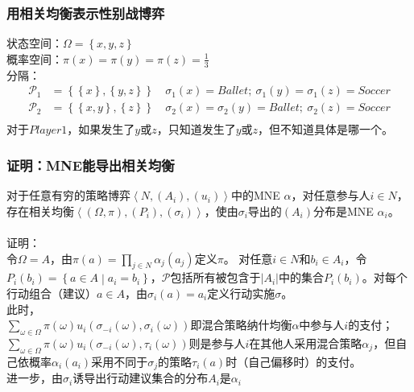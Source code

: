 \documentclass{beamer}
\begin{document}
\begin{frame}[label = interpret_correlated_equilibrium_using_BoS]
	\frametitle{用相关均衡表示性别战博弈}
	状态空间：$\Omega=\left\lbrace x,y,z\right\rbrace $\\
	概率空间：$\pi\left(x\right)=\pi\left(y\right)=\pi\left(z\right)=\frac{1}{3}$\\
	分隔：
	\begin{equation*}
		\begin{aligned}
			\mathcal{P}_{1} &= \left\lbrace \left\lbrace x\right\rbrace ,\left\lbrace y,z\right\rbrace \right\rbrace &\ \sigma_{1}\left( x\right)=Ballet;\ \sigma_{1}\left( y\right) =\sigma_{1}\left( z\right) =Soccer\\
			\mathcal{P}_{2} &= \left\lbrace \left\lbrace x,y\right\rbrace ,\left\lbrace z\right\rbrace \right\rbrace &\ \sigma_{2}\left( x\right) =\sigma_{2}\left( y\right) =Ballet;\ \sigma_{2}\left( z\right) =Soccer \\
		\end{aligned}
	\end{equation*}
	对于$Player 1$，如果发生了$y$或$z$，只知道发生了$y$或$z$，但不知道具体是哪一个。
	
\end{frame}

\begin{frame}[label = MNE_and_correlated_equilibrium]
	\frametitle{证明：MNE能导出相关均衡}
	对于任意有穷的策略博弈$\left\langle N,\left( A_{i}\right) ,\left( u_{i}\right) \right\rangle $中的MNE $\alpha$，对任意参与人$i\in N$，存在相关均衡$\left\langle \left( \Omega,\pi\right) ,\left( P_{i}\right) ,\left( \sigma_{i}\right) \right\rangle $，使由$\sigma_{i}$导出的$\left( A_{i}\right)$分布是MNE $\alpha_{i}$。\\~\\
	\alert{{\large 证明：}}\\
	令$\Omega = A$，由$ \pi\left(a\right)=\prod\limits_{j\in N} \alpha_{j} \left(a_{j}\right) $定义$\pi$。
	对任意$i\in N$和$b_{i}\in A_{i}$，令$P_{i}\left(b_{i}\right)=\left\lbrace a\in A \middle| a_{i}=b_{i} \right\rbrace$，$\mathcal{P}$包括所有被包含于$\left|A_{i}\right|$中的集合$P _{i}\left(b_{i}\right)$。对每个行动组合（建议）$a\in A$，由$\sigma_{i}\left(a\right)=a_{i}$定义行动实施$\sigma$。\\
	此时，\\
	$\sum\limits_{\omega\in\Omega} \pi\left(\omega\right)u_{i}\left(\sigma_{-i}\left(\omega\right),\sigma_{i}\left(\omega\right)\right)$即混合策略纳什均衡$\alpha$中参与人$i$的支付；\\
	$\sum\limits_{\omega\in\Omega} \pi\left(\omega\right)u_{i}\left(\sigma_{-i}\left(\omega\right),\tau_{i}\left(\omega\right)\right)$则是参与人$i$在其他人采用混合策略$\alpha_{j}$，但自己依概率$\alpha_{i}\left(a_{i}\right)$采用不同于$\sigma_{j}$的策略$\tau_{i}\left(a\right)$时（自己偏移时）的支付。\\
	进一步，由$\sigma_{i}$诱导出行动建议集合的分布$A_{i}$是$\alpha_{i}$
\end{frame}
\end{document}
